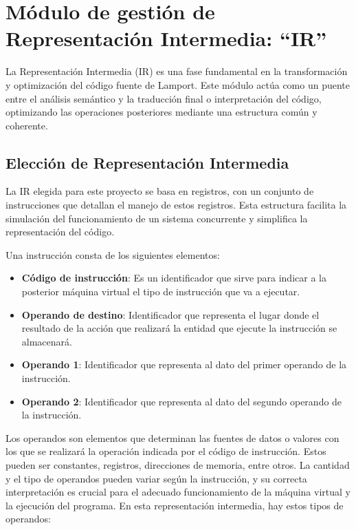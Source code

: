 \section{Módulo de gestión de Representación Intermedia: ``IR''}\label{sec:implementacionIR}
La Representación Intermedia (IR) es una fase fundamental en la transformación y optimización del código fuente de Lamport. Este módulo actúa como un puente entre el análisis semántico y la traducción final o interpretación del código, optimizando las operaciones posteriores mediante una estructura común y coherente.

\subsection{Elección de Representación Intermedia}
La IR elegida para este proyecto se basa en registros, con un conjunto de instrucciones que detallan el manejo de estos registros. Esta estructura facilita la simulación del funcionamiento de un sistema concurrente y simplifica la representación del código.

\noindent
Una instrucción consta de los siguientes elementos:

\begin{itemize}
    \item \textbf{Código de instrucción}: Es un identificador que sirve para indicar a la posterior máquina virtual el tipo de instrucción que va a ejecutar.
    \item \textbf{Operando de destino}: Identificador que representa el lugar donde el resultado de la acción que realizará la entidad que ejecute la instrucción se almacenará.
    \item \textbf{Operando 1}: Identificador que representa al dato del primer operando de la instrucción.
    \item \textbf{Operando 2}: Identificador que representa al dato del segundo operando de la instrucción.
\end{itemize}

Los operandos son elementos que determinan las fuentes de datos o valores con los que se realizará la operación indicada por el código de instrucción. Estos pueden ser constantes, registros, direcciones de memoria, entre otros. La cantidad y el tipo de operandos pueden variar según la instrucción, y su correcta interpretación es crucial para el adecuado funcionamiento de la máquina virtual y la ejecución del programa. En esta representación intermedia, hay estos tipos de operandos:

